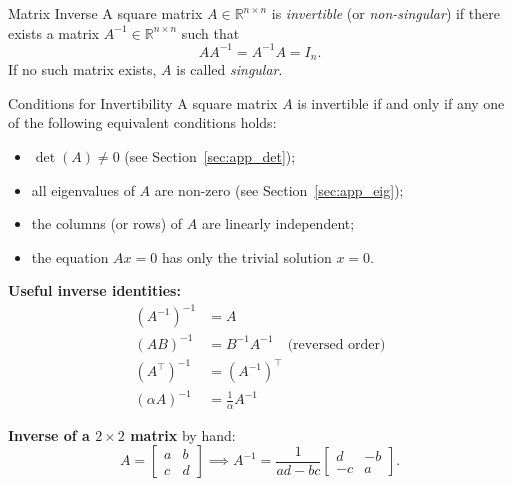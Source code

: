 \begin{defnbox}{Matrix Inverse}
	A square matrix $A \in \mathbb{R}^{n\times n}$ is \emph{invertible}
	(or \emph{non-singular}) if there exists a matrix
	$A^{-1} \in \mathbb{R}^{n\times n}$ such that
	\[
	A A^{-1} = A^{-1} A = I_n.
	\]
	If no such matrix exists, $A$ is called \emph{singular}.
\end{defnbox}

\begin{defnbox}{Conditions for Invertibility}
	A square matrix $A$ is invertible if and only if any one of the
	following equivalent conditions holds:
	\begin{itemize}[noitemsep]
		\item $\det(A) \neq 0$ (see Section~\ref{sec:app_det});
		\item all eigenvalues of $A$ are non-zero
		(see Section~\ref{sec:app_eig});
		\item the columns (or rows) of $A$ are linearly independent;
		\item the equation $A{x} = 0$ has only the trivial
		solution ${x} = 0$.
	\end{itemize}
\end{defnbox}

\textbf{Useful inverse identities:}
\begin{align}
	(A^{-1})^{-1} &= A \\
	(AB)^{-1}     &= B^{-1} A^{-1} \quad \text{(reversed order)} \\
	(A^\top)^{-1} &= (A^{-1})^\top \\
	(\alpha A)^{-1} &= \tfrac{1}{\alpha} A^{-1}
\end{align}

\textbf{Inverse of a $2\times2$ matrix} by hand:
\[
A = \begin{bmatrix} a & b \\ c & d \end{bmatrix}
\implies
A^{-1} = \frac{1}{ad - bc}
\begin{bmatrix} d & -b \\ -c & a \end{bmatrix}.
\]

